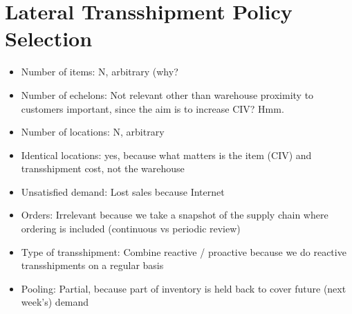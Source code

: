 \documentclass[../../main.tex]{subfiles}
\begin{document}

\section{Lateral Transshipment Policy Selection}

\begin{itemize}
\item Number of items: N, arbitrary (why?
\item Number of echelons: Not relevant other than warehouse proximity to customers important, since the aim is to increase CIV? Hmm.
\item Number of locations: N, arbitrary
\item Identical locations: yes, because what matters is the item (CIV) and transshipment cost, not the warehouse
\item Unsatisfied demand: Lost sales because Internet
\item Orders: Irrelevant because we take a snapshot of the supply chain where ordering is included (continuous vs periodic review)
\item Type of transshipment: Combine reactive / proactive because we do reactive transshipments on a regular basis
\item Pooling: Partial, because part of inventory is held back to cover future (next week's) demand
\end{itemize}




\end{document}
